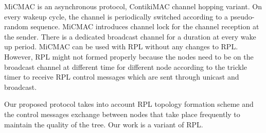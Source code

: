 MiCMAC \cite{micmac} is an asynchronous protocol, ContikiMAC \cite{contikimac} channel hopping variant. On every wakeup cycle, the channel is periodically switched according to a pseudo-random sequence. MiCMAC introduces channel lock for the channel reception at the sender. There is a dedicated broadcast channel for a duration at every wake up period. MiCMAC can be used with RPL without any changes to RPL. However, RPL might not formed properly because the nodes need to be on the broadcast channel at different time for different node according to the trickle timer to receive RPL control messages which are sent through unicast and broadcast.

Our proposed protocol takes into account RPL topology formation scheme and the control messages exchange between nodes that take place frequently to maintain the quality of the tree. Our work is a variant of RPL.




